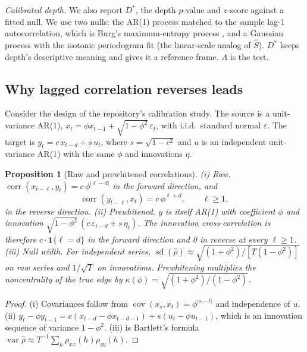 \documentclass[10pt,twocolumn,letterpaper]{article}
\newtheorem{proposition}{Proposition}
\theoremstyle{definition}
\theoremstyle{remark}
\newcommand{\corr}{\operatorname{corr}}
\newcommand{\cov}{\operatorname{cov}}
\newcommand{\sd}{\operatorname{sd}}
\newcommand{\ind}{\mathbf{1}}
\begin{document}
\textit{Calibrated depth.} We also report $D^*$, the depth $p$-value and
$z$-score against a fitted null. We use two nulls: the AR(1) process matched to
the sample lag-1 autocorrelation, which is Burg's maximum-entropy process
\cite{burg}, and a Gaussian process with the isotonic periodogram fit (the
linear-scale analog of $\hat S$). $D^*$ keeps depth's descriptive meaning and
gives it a reference frame. $\Lambda$ is the test.

\subsection{Why lagged correlation reverses leads}

Consider the design of the repository's calibration study. The source is a
unit-variance AR(1), $x_t=\phi x_{t-1}+\sqrt{1-\phi^2}\,\varepsilon_t$, with
i.i.d.\ standard normal $\varepsilon$. The target is $y_t=c\,x_{t-d}+s\,u_t$,
where $s=\sqrt{1-c^2}$ and $u$ is an independent unit-variance AR(1) with the
same $\phi$ and innovations $\eta$.

\begin{proposition}[Raw and prewhitened correlations]\label{prop:rev}
(i) \emph{Raw.} $\corr(x_{t-\ell},y_t)=c\,\phi^{|\ell-d|}$ in the forward
direction, and
\begin{equation}\label{eq:rev}
\corr(y_{t-\ell},x_t)=c\,\phi^{\ell+d},\qquad \ell\ge1,
\end{equation}
in the reverse direction. (ii) \emph{Prewhitened.} $y$ is itself AR(1) with
coefficient $\phi$ and innovation $\sqrt{1-\phi^2}\,(c\,\varepsilon_{t-d}+s\,\eta_t)$.
The innovation cross-correlation is therefore $c\cdot\ind\{\ell=d\}$ in the
forward direction and 0 in reverse at every $\ell\ge1$. (iii) \emph{Null
width.} For independent series,
$\sd(\hat\rho)\approx\sqrt{(1+\phi^2)/[T(1-\phi^2)]}$ on raw series
\cite{bartlett} and $1/\sqrt T$ on innovations. Prewhitening multiplies the
noncentrality of the true edge by $\kappa(\phi)=\sqrt{(1+\phi^2)/(1-\phi^2)}$.
\end{proposition}
\begin{proof}
(i) Covariances follow from $\cov(x_s,x_t)=\phi^{|s-t|}$ and independence of
$u$. (ii) $y_t-\phi y_{t-1}=c(x_{t-d}-\phi x_{t-d-1})+s(u_t-\phi u_{t-1})$, which
is an innovation sequence of variance $1-\phi^2$. (iii) is Bartlett's formula
$\operatorname{var}\hat\rho\approx T^{-1}\sum_h\rho_{xx}(h)\rho_{yy}(h)$.
\end{proof}
\end{document}
